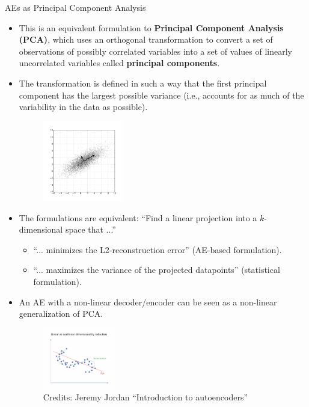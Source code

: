 \begin{vbframe}{AEs as Principal Component Analysis}
\begin{itemize}
    \framebreak 

    \item This is an equivalent formulation to \textbf{Principal Component Analysis (PCA)}, which uses an orthogonal transformation to convert a set of observations of possibly correlated variables into a set of values of linearly uncorrelated variables called \textbf{principal components}. 
    \item The transformation is defined in such a way that the first principal component has the largest possible variance (i.e., accounts for as much of the variability in the data as possible).  
    \begin{figure}
    \centering
    \includegraphics[width=3.5cm]{plots/PCA.png}
    \end{figure}

    \framebreak 

    \item The formulations are equivalent: \enquote{Find a linear projection into a $k$-dimensional space that ...}
    \begin{itemize}
      \item \enquote{... minimizes the L2-reconstruction error} (AE-based formulation).
      \item \enquote{... maximizes the variance of the projected datapoints} (statistical formulation). 
    \end{itemize}
  

    \item An AE with a non-linear decoder/encoder can be seen as a non-linear generalization of PCA.

    \vspace*{-0.2cm}

    \begin{figure}
    \begin{center}
    \includegraphics[width=0.3\textwidth]{plots/manifold1.png}
    \caption{Credits: Jeremy Jordan \enquote{Introduction to autoencoders}}
    \end{center}
    \end{figure}

  \end{itemize}
  
\end{vbframe}


